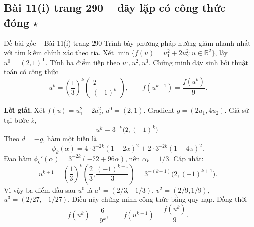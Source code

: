 \documentclass[11pt,a4paper]{article}
\newcommand{\R}{\mathbb{R}}
\newcommand{\T}{^{\mathsf T}}
\begin{document}
\subsection{Bài 11(i) trang 290 -- dãy lặp có công thức đóng \(\star\)}
\begin{questionbox}{Đề bài gốc -- Bài 11(i) trang 290}
Trình bày phương pháp hướng giảm nhanh nhất với tìm kiếm chính xác theo tia. Xét \(\min\{f(u)=u_1^2+2u_2^2:u\in\R^2\}\), lấy \(u^0=(2,1)\T\). Tính ba điểm tiếp theo \(u^1,u^2,u^3\). Chứng minh dãy sinh bởi thuật toán có công thức
\[
u^k=\left(\frac13\right)^k\begin{pmatrix}2\\(-1)^k\end{pmatrix},\qquad f(u^{k+1})=\frac{f(u^k)}9.
\]
\end{questionbox}
\textbf{Lời giải.}
Xét \(f(u)=u_1^2+2u_2^2\), \(u^0=(2,1)\). Gradient \(g=(2u_1,4u_2)\). Giả sử tại bước \(k\),
\[
u^k=3^{-k}\big(2,(-1)^k\big).
\]
Theo \(d=-g\), hàm một biến là
\[
\phi_k(\alpha)=4\cdot3^{-2k}(1-2\alpha)^2+
2\cdot3^{-2k}(1-4\alpha)^2.
\]
Đạo hàm \(\phi_k'(\alpha)=3^{-2k}(-32+96\alpha)\), nên \(\alpha_k=1/3\). Cập nhật:
\[
u^{k+1}=\left(\frac13\right)^k\left(\frac23,\frac{(-1)^{k+1}}3\right)
=3^{-(k+1)}\big(2,(-1)^{k+1}\big).
\]
Vì vậy ba điểm đầu sau \(u^0\) là \(u^1=(2/3,-1/3)\), \(u^2=(2/9,1/9)\), \(u^3=(2/27,-1/27)\).
Điều này chứng minh công thức bằng quy nạp. Đồng thời
\[
f(u^k)=\frac6{9^k},\qquad f(u^{k+1})=\frac{f(u^k)}9.
\]

\clearpage
\end{document}
